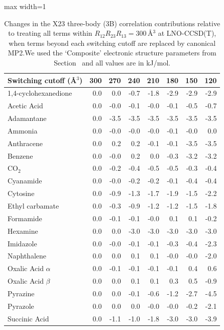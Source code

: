 \begin{table}[h]
\centering
\caption{\label{tab:x23_3b_multilevel_mp2}Changes in the X23 three-body (3B) correlation contributions relative to treating all terms within $R_{12}R_{23}R_{13}=300\,$\AA{}$^3$ at LNO-CCSD(T), when terms beyond each switching cutoff are replaced by canonical MP2.We used the `Composite' electronic structure parameters from Section~ and all values are in kJ/mol.}
\begin{adjustbox}{max width=1\textwidth}
\begin{tabular}{lrrrrrrr}
\toprule
Switching cutoff (\AA{}$^3$) & 300 & 270 & 240 & 210 & 180 & 150 & 120 \\ 
\midrule
1,4-cyclohexanedione & 0.0 & 0.0 & -0.7 & -1.8 & -2.9 & -2.9 & -2.9 \\
Acetic Acid & 0.0 & -0.0 & -0.1 & -0.0 & -0.1 & -0.5 & -0.7 \\
Adamantane & 0.0 & -3.5 & -3.5 & -3.5 & -3.5 & -3.5 & -3.5 \\
Ammonia & 0.0 & -0.0 & -0.0 & -0.0 & -0.1 & -0.0 & 0.0 \\
Anthracene & 0.0 & 0.2 & 0.2 & -0.1 & -0.1 & -3.5 & -3.5 \\
Benzene & 0.0 & -0.0 & 0.2 & 0.0 & -0.3 & -3.2 & -3.2 \\
CO$_2$ & 0.0 & -0.2 & -0.4 & -0.5 & -0.5 & -0.3 & -0.4 \\
Cyanamide & 0.0 & -0.0 & -0.2 & -0.2 & -0.1 & -0.4 & -0.4 \\
Cytosine & 0.0 & -0.9 & -1.3 & -1.7 & -1.9 & -1.5 & -2.2 \\
Ethyl carbamate & 0.0 & -0.3 & -0.9 & -1.2 & -1.2 & -1.5 & -1.8 \\
Formamide & 0.0 & -0.1 & -0.1 & -0.0 & 0.1 & 0.1 & -0.2 \\
Hexamine & 0.0 & 0.0 & -3.0 & -3.0 & -3.0 & -3.0 & -3.0 \\
Imidazole & 0.0 & -0.0 & -0.1 & -0.1 & -0.3 & -0.4 & -2.3 \\
Naphthalene & 0.0 & 0.0 & 0.1 & 0.1 & -0.0 & -0.0 & -2.0 \\
Oxalic Acid $\alpha$ & 0.0 & -0.1 & -0.1 & -0.1 & -0.1 & 0.4 & 0.6 \\
Oxalic Acid $\beta$ & 0.0 & 0.0 & 0.1 & 0.1 & 0.3 & 0.5 & -0.9 \\
Pyrazine & 0.0 & 0.0 & -0.1 & -0.6 & -1.2 & -2.7 & -4.5 \\
Pyrazole & 0.0 & 0.0 & 0.0 & -0.0 & -0.0 & -0.2 & -2.1 \\
Succinic Acid & 0.0 & -1.1 & -1.0 & -1.8 & -3.0 & -3.0 & -3.9 \\

\end{tabular}
\end{adjustbox}
\end{table}
